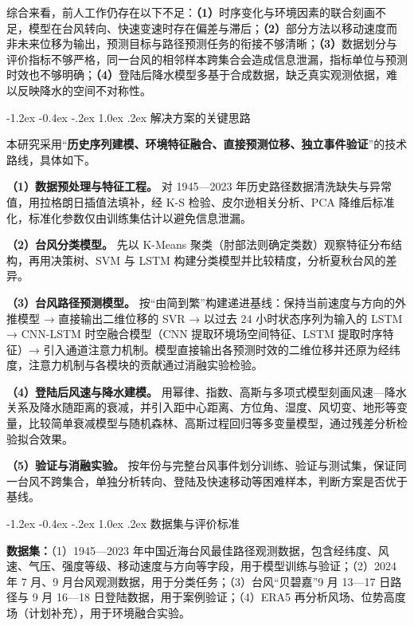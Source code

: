 \documentclass[twoside,withoutpreface,bwprint]{cumcmthesis}
\makeatletter
\renewcommand\section{\@startsection{section}{1}{\z@}%
    {-1.2ex \@plus -0.4ex \@minus -.2ex}%
    {1.0ex \@plus.2ex}%
    {\centering\normalfont\heiti\zihao{4}}}
\makeatother
\begin{document}
综合来看，前人工作仍存在以下不足：\textbf{（1）}时序变化与环境因素的联合刻画不足，模型在台风转向、快速变速时存在偏差与滞后；\textbf{（2）}部分方法以移动速度而非未来位移为输出，预测目标与路径预测任务的衔接不够清晰；\textbf{（3）}数据划分与评价指标不够严格，同一台风的相邻样本跨集合会造成信息泄漏，指标单位与预测时效也不够明确；\textbf{（4）}登陆后降水模型多基于合成数据，缺乏真实观测依据，难以反映降水的空间不对称性。

\section{解决方案的关键思路}

本研究采用“\textbf{历史序列建模、环境特征融合、直接预测位移、独立事件验证}”的技术路线，具体如下。

\textbf{（1）数据预处理与特征工程。} 对 1945—2023 年历史路径数据清洗缺失与异常值，用拉格朗日插值法填补，经 K-S 检验、皮尔逊相关分析、PCA 降维后标准化，标准化参数仅由训练集估计以避免信息泄漏。

\textbf{（2）台风分类模型。} 先以 K-Means 聚类（肘部法则确定类数）观察特征分布结构，再用决策树、SVM 与 LSTM 构建分类模型并比较精度，分析夏秋台风的差异。

\textbf{（3）台风路径预测模型。} 按“由简到繁”构建递进基线：保持当前速度与方向的外推模型 → 直接输出二维位移的 SVR → 以过去 24 小时状态序列为输入的 LSTM → CNN-LSTM 时空融合模型（CNN 提取环境场空间特征、LSTM 提取时序特征）→ 引入通道注意力机制。模型直接输出各预测时效的二维位移并还原为经纬度，注意力机制与各模块的贡献通过消融实验检验。

\textbf{（4）登陆后风速与降水建模。} 用幂律、指数、高斯与多项式模型刻画风速—降水关系及降水随距离的衰减，并引入距中心距离、方位角、湿度、风切变、地形等变量，比较简单衰减模型与随机森林、高斯过程回归等多变量模型，通过残差分析检验拟合效果。

\textbf{（5）验证与消融实验。} 按年份与完整台风事件划分训练、验证与测试集，保证同一台风不跨集合，单独分析转向、登陆及快速移动等困难样本，判断方案是否优于基线。

\section{数据集与评价标准}

\textbf{数据集：}（1）1945—2023 年中国近海台风最佳路径观测数据，包含经纬度、风速、气压、强度等级、移动速度与方向等字段，用于模型训练与验证；（2）2024 年 7 月、9 月台风观测数据，用于分类任务；（3）台风“贝碧嘉”9 月 13—17 日路径与 9 月 16—18 日登陆数据，用于案例验证；（4）ERA5 再分析风场、位势高度场（计划补充），用于环境融合实验。
\end{document}
